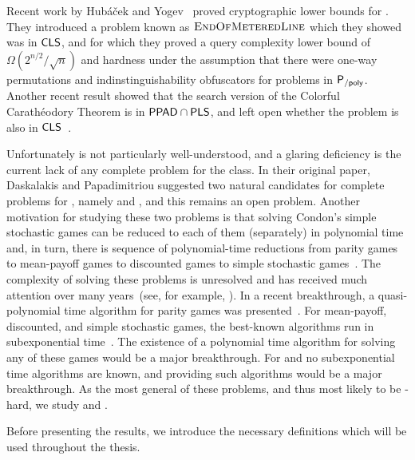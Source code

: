 
Recent work by Hub\'{a}\v{c}ek and Yogev~\cite{hubavcek2017hardness} proved cryptographic 
lower bounds for \CLS. They introduced
a problem known as $\textsc{EndOfMeteredLine}$ which they showed was in $\mathsf{CLS}$, and for which they
proved a query complexity lower bound of $\Omega(2^{n/2}/\sqrt{n})$ and
hardness under the assumption that there were one-way permutations and
indinstinguishability obfuscators for problems in $\mathsf{P_{/poly}}$.
%
Another recent result showed that the search version of the Colorful
Carath\'eodory Theorem is in $\mathsf{PPAD} \cap \mathsf{PLS}$, and left open
whether the problem is also in $\mathsf{CLS}$~\cite{colorfulcara2017}.

Unfortunately \CLS is not particularly well-understood, and a glaring
deficiency is the current lack of any complete problem for the class. In their
original paper, Daskalakis and Papadimitriou suggested two natural candidates
for complete problems for \CLS, namely \CM and \PLCP, and this remains an
open problem.
Another motivation for studying these two problems is that 
solving Condon's simple stochastic games can be reduced to each of them
(separately) in polynomial time
and, in turn, there is sequence of polynomial-time reductions from parity games 
to mean-payoff games to discounted games to simple stochastic 
games~\cite{puri1996theory,gartner2005simple,jurdzinski2008simple,zwick1996complexity,hansen2013complexity}.
The complexity of solving these problems is unresolved and has received 
much attention over many years~(see, for example, 
\cite{zwick1996complexity,condon1992complexity,fearnley2010linear,jurdzinski1998deciding,bjorklund2004combinatorial,fearnley2016complexity}).
In a recent breakthrough, a quasi-polynomial time algorithm for parity games
was presented~\cite{parity}.
For mean-payoff, discounted, and simple stochastic games, the best-known 
algorithms run in subexponential time~\cite{ludwig1995subexponential}.
The existence of a polynomial time algorithm for solving any of these games
would be a major breakthrough.
For \ContractionMap and \PLCP no subexponential time algorithms 
are known, and providing such algorithms would be a major breakthrough.
As the most general of these problems, and thus most likely to be 
\CLS-hard, we study \ContractionMap and \PLCP.

Before presenting the results, we introduce the necessary definitions which will be used throughout the thesis. 

